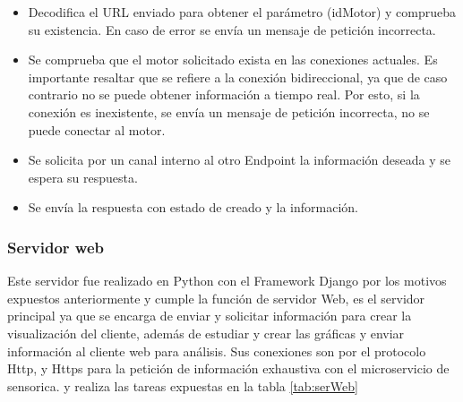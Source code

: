     \begin{itemize}
        \item Decodifica el URL enviado para obtener el parámetro (idMotor) y
            comprueba su existencia. En caso de error se envía un mensaje
            de petición incorrecta.
        \item Se comprueba que el motor solicitado exista en las conexiones
            actuales. Es importante resaltar que se refiere a la conexión
            bidireccional, ya que de caso contrario no se puede obtener información
            a tiempo real. Por esto, si la conexión es inexistente, se envía un
            mensaje de petición incorrecta, no se puede conectar al motor.
        \item Se solicita por un canal interno al otro Endpoint la información
            deseada y se espera su respuesta.
        \item Se envía la respuesta con estado de creado y la información.
    \end{itemize}

    \subsubsection{Servidor web}
    Este servidor fue realizado en Python con el Framework Django
    por los motivos expuestos anteriormente y cumple la función de servidor Web,
    es el servidor principal ya que se encarga de enviar y solicitar información
    para crear la visualización del cliente, además de estudiar y crear las gráficas
    y enviar información al cliente web para análisis.
    Sus conexiones son por el protocolo Http, y Https para la petición de información
    exhaustiva con el microservicio de sensorica. y realiza las tareas expuestas
    en la tabla \ref{tab:serWeb}

